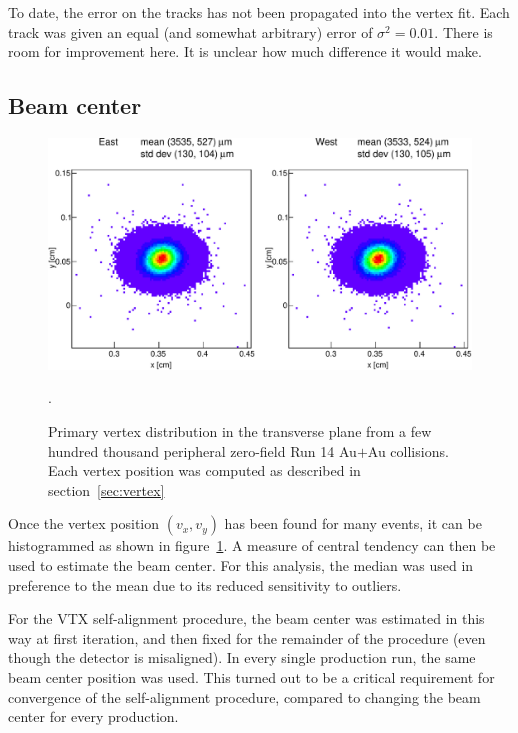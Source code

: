 \documentclass[12pt]{article}
\begin{document}
To date, the error on the tracks has not been propagated into the vertex fit. Each track was given an equal (and somewhat arbitrary) error of $\sigma^2 = 0.01$. There is room for improvement here. It is unclear how much difference it would make.

\subsection{Beam center}
\begin{figure}[htb]
  \begin{center}
    \includegraphics[width=\textwidth]{4/xy_vertex_0}
  \end{center}
  \caption{Primary vertex distribution in the transverse plane from a few hundred thousand peripheral zero-field Run 14 Au$+$Au collisions. Each vertex position was computed as described in section~\ref{sec:vertex}}.
  \label{fig:xyvertex}
\end{figure}

Once the vertex position $(v_x, v_y)$ has been found for many events, it can be histogrammed as shown in figure~\ref{fig:xyvertex}. A measure of central tendency can then be used to estimate the beam center. For this analysis, the median was used in preference to the mean due to its reduced sensitivity to outliers.

For the VTX self-alignment procedure, the beam center was estimated in this way at first iteration, and then fixed for the remainder of the procedure (even though the detector is misaligned). In every single production run, the same beam center position was used. This turned out to be a critical requirement for convergence of the self-alignment procedure, compared to changing the beam center for every production. 
\end{document}
